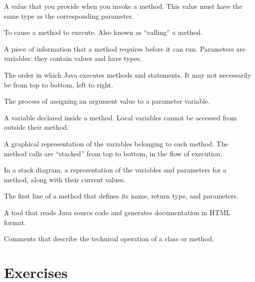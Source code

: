 \begin{description}


A value that you provide when you invoke a method.
This value must have the same type as the corresponding parameter.

To cause a method to execute.
Also known as ``calling'' a method.

A piece of information that a method requires before it can run.
Parameters are variables: they contain values and have types.


The order in which Java executes methods and statements.
It may not necessarily be from top to bottom, left to right.

The process of assigning an argument value to a parameter variable.

A variable declared inside a method.
Local variables cannot be accessed from outside their method.

A graphical representation of the variables belonging to each method.
The method calls are ``stacked'' from top to bottom, in the flow of execution.

In a stack diagram, a representation of the variables and parameters for a method, along with their current values.


The first line of a method that defines its name, return type, and parameters.

A tool that reads Java source code and generates documentation in HTML format.

Comments that describe the technical operation of a class or method.

\end{description}


\section{Exercises}

